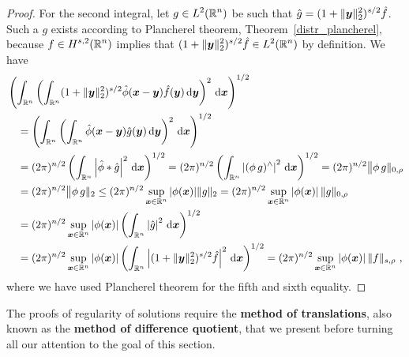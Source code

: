 \begin{proof}
For the second integral, let $\displaystyle g \in L^2(\mathbb{R}^n)$ be such that
$\displaystyle \hat{g} = (1 + \|{\bm{y}}\|_2^2)^{s/2} \hat{f}$.  Such a
$g$ exists according to Plancherel theorem, Theorem~\ref{distr_plancherel},
because $\displaystyle f \in H^{s,2}(\mathbb{R}^n)$ implies that
$\displaystyle (1 + \|{\bm{y}}\|_2^2)^{s/2} \hat{f} \in L^2(\mathbb{R}^n)$ by
definition.  We have
\begin{align*}
&\left( \int_{\RR^n} \left(
\int_{\RR^n} (1 + \|\VEC{y}\|_2^2)^{s/2} \hat{\phi}(\VEC{x}-\VEC{y})
\hat{f}(\VEC{y}) \dx{\VEC{y}} \right)^2 \dx{\VEC{x}} \right)^{1/2} \\
&\quad = \left( \int_{\RR^n} \left(
\int_{\RR^n} \hat{\phi}(\VEC{x}-\VEC{y}) \hat{g}(\VEC{y})
\dx{\VEC{y}} \right)^2 \dx{\VEC{x}} \right)^{1/2} \\
&\quad = (2\pi)^{n/2} \left(\int_{\RR^n}
\left|\hat{\phi} \ast \hat{g} \right|^2 \dx{\VEC{x}} \right)^{1/2}
= (2\pi)^{n/2}
\left(\int_{\RR^n} \left|(\phi\, g)^\wedge \right|^2 \dx{\VEC{x}} \right)^{1/2}  
= (2\pi)^{n/2} \big\| \phi\,g\|_{0,\rho} \\
&\quad = (2\pi)^{n/2} \big\| \phi\,g\|_2
\leq (2\pi)^{n/2} \sup_{\VEC{x}\in\RR^n} |\phi(\VEC{x})| \|g\|_2
= (2\pi)^{n/2} \sup_{\VEC{x}\in\RR^n} |\phi(\VEC{x})|\, \|g\|_{0,\rho} \\
&\quad = (2\pi)^{n/2} \sup_{\VEC{x}\in\RR^n} |\phi(\VEC{x})|
\left(\int_{\RR^n} \left|\hat{g} \right|^2 \dx{\VEC{x}} \right)^{1/2} \\
&\quad = (2\pi)^{n/2} \sup_{\VEC{x}\in\RR^n} |\phi(\VEC{x})|
\left(\int_{\RR^n}
\left|(1 + \|\VEC{y}\|_2^2)^{s/2} \hat{f} \right|^2 \dx{\VEC{x}} \right)^{1/2}
= (2\pi)^{n/2} \sup_{\VEC{x}\in\RR^n} |\phi(\VEC{x})|\, \|f\|_{s,\rho} \ ,
\end{align*}
where we have used Plancherel theorem for the fifth and sixth equality.
\end{proof}

The proofs of regularity of solutions require the
{\bfseries method of translations}, also
known as the
{\bfseries method of difference quotient},
that we present before turning all our attention to the goal of this section.

